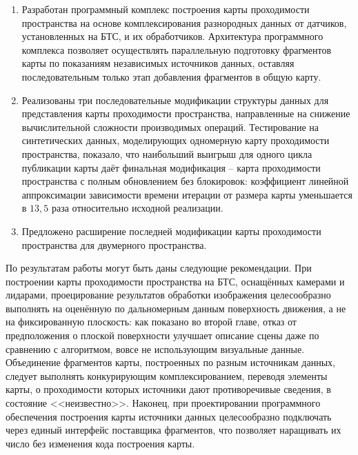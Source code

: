 \begin{enumerate}
	\item Разработан программный комплекс построения карты проходимости пространства на основе комплексирования разнородных данных от датчиков, установленных на БТС, и их обработчиков. Архитектура программного комплекса позволяет осуществлять параллельную подготовку фрагментов карты по показаниям независимых источников данных, оставляя последовательным только этап добавления фрагментов в общую карту.
	\item Реализованы три последовательные модификации структуры данных для представления карты проходимости пространства, направленные на снижение вычислительной сложности производимых операций. Тестирование на синтетических данных, моделирующих одномерную карту проходимости пространства, показало, что наибольший выигрыш для одного цикла публикации карты даёт финальная модификация -- карта проходимости пространства с полным обновлением без блокировок: коэффициент линейной аппроксимации зависимости времени итерации от размера карты уменьшается в $13,5$ раза относительно исходной реализации.
	\item Предложено расширение последней модификации карты проходимости пространства для двумерного пространства.
\end{enumerate}

По результатам работы могут быть даны следующие рекомендации. При построении карты проходимости пространства на БТС, оснащённых камерами и лидарами, проецирование результатов обработки изображения целесообразно выполнять на оценённую по дальномерным данным поверхность движения, а не на фиксированную плоскость: как показано во второй главе, отказ от предположения о плоской поверхности улучшает описание сцены даже по сравнению с алгоритмом, вовсе не использующим визуальные данные. Объединение фрагментов карты, построенных по разным источникам данных, следует выполнять конкурирующим комплексированием, переводя элементы карты, о проходимости которых источники дают противоречивые сведения, в состояние <<неизвестно>>. Наконец, при проектировании программного обеспечения построения карты источники данных целесообразно подключать через единый интерфейс поставщика фрагментов, что позволяет наращивать их число без изменения кода построения карты.

